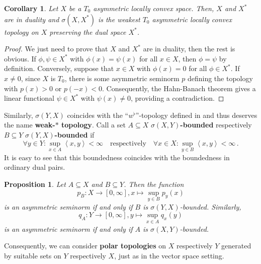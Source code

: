 \documentclass[
	paper=A4,
	pagesize=auto,
	fontsize=12pt
]{scrartcl}
\theoremstyle{plain}
\newtheorem{proposition}[theorem]{Proposition}
\newtheorem{corollary}[theorem]{Corollary}
\theoremstyle{remark}
\theoremstyle{definition}
\begin{document}
%
\begin{corollary}
\label{cor:XandXDualAreInDuality}
Let $X$ be a $T_0$ asymmetric locally convex space.
Then, $X$ and $X^*$ are in duality and $\sigma(X, X^*)$ is the weakest $T_0$ asymmetric locally convex topology on $X$ preserving the dual space $X^*$.
\end{corollary}
\begin{proof}
We just need to prove that $X$ and $X^*$ are in duality, then the rest is obvious.
If $\phi, \psi \in X^*$ with $\phi(x) = \psi(x)$ for all $x \in X$, then $\phi = \psi$ by definition.
Conversely, suppose that $x \in X$ with $\phi(x) = 0$ for all $\phi \in X^*$.
If $x \neq 0$, since $X$ is $T_0$, there is some asymmetric seminorm $p$ defining the topology with $p(x) > 0$ or $p(-x) < 0$.
Consequently, the Hahn-Banach theorem \cite[Theorem 2.2.2]{src:Cobzaş:FunctionalAnalysisinAsymmetricNormedSpaces} gives a linear functional $\psi \in X^*$ with $\psi(x) \neq 0$, providing a contradiction.
\end{proof}
%
Similarly, $\sigma(Y, X)$ coincides with the \enquote{$w^\flat$}-topology defined in \cite[Section 2.4.6]{src:Cobzaş:FunctionalAnalysisinAsymmetricNormedSpaces} and thus deserves the name \textbf{weak-$\ast$ topology}.
Call a set $A \subseteq X$ \textbf{$\sigma(X,Y)$-bounded} respectively $B \subseteq Y$ \textbf{$\sigma(Y,X)$-bounded} if
%
\begin{equation}
\forall y \in Y : \sup_{x \in A} \left< x, y \right> < \infty
\quad\text{respectively}\quad
\forall x \in X : \sup_{y \in B} \left< x, y \right> < \infty \, .
\end{equation}
%
It is easy to see that this boundedness coincides with the boundedness in ordinary dual pairs.
%
\begin{proposition}
Let $A \subseteq X$ and $B \subseteq Y$.
Then the function
%
\begin{equation}
p_B : X \to [0, \infty], x \mapsto \sup_{y \in B} p_y \left( x \right)
\end{equation}
%
is an asymmetric seminorm if and only if $B$ is $\sigma(Y, X)$-bounded.
Similarly,
%
\begin{equation}
q_A : Y \to [0, \infty], y \mapsto \sup_{x \in A} q_x \left( y \right)
\end{equation}
%
is an asymmetric seminorm if and only if $A$ is $\sigma(X, Y)$-bounded.
\end{proposition}
%
Consequently, we can consider \textbf{polar topologies} on $X$ respectively $Y$ generated by suitable sets on $Y$ respectively $X$, just as in the vector space setting.
\end{document}
